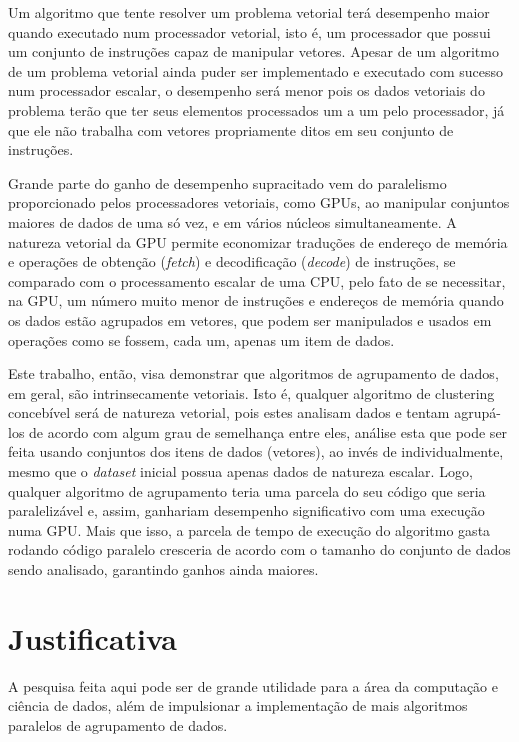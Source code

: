 \documentclass[12pt,
openright, 
oneside, %
a4paper,    %
brazil]{facom-ufu-abntex2}
\begin{document}
Um algoritmo que tente resolver um problema vetorial terá desempenho maior quando executado num processador vetorial, isto é, um processador que possui um conjunto de instruções capaz de manipular vetores. Apesar de um algoritmo de um problema vetorial ainda puder ser implementado e executado com sucesso num processador escalar, o desempenho será menor pois os dados vetoriais do problema terão que ter seus elementos processados um a um pelo processador, já que ele não trabalha com vetores propriamente ditos em seu conjunto de instruções.

Grande parte do ganho de desempenho supracitado vem do paralelismo proporcionado pelos processadores vetoriais, como GPUs, ao manipular conjuntos maiores de dados de uma só vez, e em vários núcleos simultaneamente. A natureza vetorial da GPU permite economizar traduções de endereço de memória e operações de obtenção (\textit{fetch}) e decodificação (\textit{decode}) de instruções, se comparado com o processamento escalar de uma CPU, pelo fato de se necessitar, na GPU, um número muito menor de instruções e endereços de memória quando os dados estão agrupados em vetores, que podem ser manipulados e usados em operações como se fossem, cada um, apenas um item de dados.

Este trabalho, então, visa demonstrar que algoritmos de agrupamento de dados, em geral, são intrinsecamente vetoriais. Isto é, qualquer algoritmo de clustering concebível será de natureza vetorial, pois estes analisam dados e tentam agrupá-los de acordo com algum grau de semelhança entre eles, análise esta que pode ser feita usando conjuntos dos itens de dados (vetores), ao invés de individualmente, mesmo que o \textit{dataset} inicial possua apenas dados de natureza escalar. Logo, qualquer algoritmo de agrupamento teria uma parcela do seu código que seria paralelizável e, assim, ganhariam desempenho significativo com uma execução numa GPU. Mais que isso, a parcela de tempo de execução do algoritmo gasta rodando código paralelo cresceria de acordo com o tamanho do conjunto de dados sendo analisado, garantindo ganhos ainda maiores.




\section{Justificativa}

A pesquisa feita aqui pode ser de grande utilidade para a área da computação e ciência de dados, além de impulsionar a implementação de mais algoritmos paralelos de agrupamento de dados.
\end{document}

